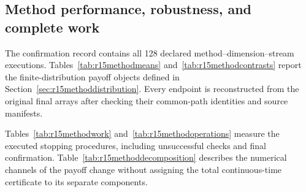 \subsection{Method performance, robustness, and complete work}

\label{sec:r15methodresults}

The confirmation record contains all 128 declared method--dimension--stream executions. Tables~\ref{tab:r15methodmeans} and~\ref{tab:r15methodcontrasts} report the finite-distribution payoff objects defined in Section~\ref{sec:r15methoddistribution}. Every endpoint is reconstructed from the original final arrays after checking their common-path identities and source manifests.

Tables~\ref{tab:r15methodwork} and~\ref{tab:r15methodoperations} measure the executed stopping procedures, including unsuccessful checks and final confirmation. Table~\ref{tab:r15methoddecomposition} describes the numerical channels of the payoff change without assigning the total continuous-time certificate to its separate components.










